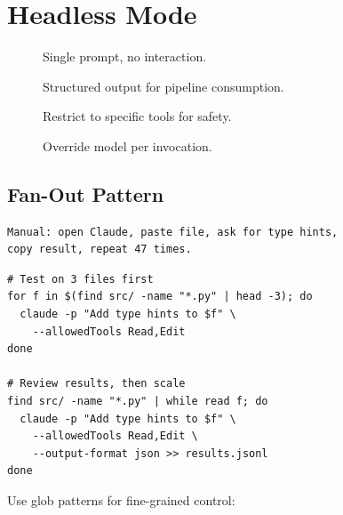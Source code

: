 \section{Headless Mode}
\label{sec:headless}



\begin{description}
  \item[] Single prompt, no interaction.
  \item[] Structured output for pipeline consumption.
  \item[] Restrict to specific tools for safety.
  \item[] Override model per invocation.
\end{description}

\subsection{Fan-Out Pattern}

\begin{fullwidth}
\begin{beforeafter}
\before
\begin{verbatim}
Manual: open Claude, paste file, ask for type hints,
copy result, repeat 47 times.
\end{verbatim}

\after
\begin{verbatim}
# Test on 3 files first
for f in $(find src/ -name "*.py" | head -3); do
  claude -p "Add type hints to $f" \
    --allowedTools Read,Edit
done

# Review results, then scale
find src/ -name "*.py" | while read f; do
  claude -p "Add type hints to $f" \
    --allowedTools Read,Edit \
    --output-format json >> results.jsonl
done
\end{verbatim}
\end{beforeafter}
\end{fullwidth}

Use glob patterns for fine-grained control:

